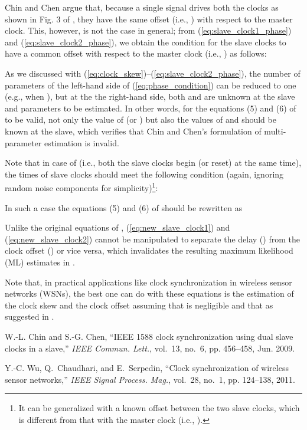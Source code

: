 \documentclass[journal,twoside,final]{IEEEtran}
\begin{document}
Chin and Chen argue that, because a single signal drives both the clocks as
shown in Fig. 3 of \cite{chin09:_ieee}, they have the same offset (i.e.,
) with respect to the master clock. This, however, is not the case in
general; from (\ref{eq:slave_clock1_phase}) and (\ref{eq:slave_clock2_phase}),
we obtain the condition for the slave clocks to have a common offset with
respect to the master clock (i.e., )
as follows:

As we discussed with (\ref{eq:clock_skew})--(\ref{eq:slave_clock2_phase}), the
number of parameters of the left-hand side of (\ref{eq:phase_condition}) can be
reduced to one (e.g.,  when ), but at
the the right-hand side, both  and  are unknown at the
slave and parameters to be estimated. In other words, for the equations (5) and
(6) of \cite{chin09:_ieee} to be valid, not only the value of  (or
) but also the values of  and  should be
known at the slave, which verifies that Chin and Chen's formulation of
multi-parameter estimation is invalid.

Note that in case of  (i.e., both the slave clocks
begin (or reset) at the same time), the times of slave clocks should meet the
following condition (again, ignoring random noise components for
simplicity)\footnote{It can be generalized with a known offset between the two
  slave clocks, which is different from that with the master clock (i.e.,
  ).}:

In such a case the equations (5) and (6) of \cite{chin09:_ieee} should be
rewritten as
\begingroup
\setlength{\arraycolsep}{0.0em}

\endgroup
Unlike the original equations of \cite{chin09:_ieee},
(\ref{eq:new_slave_clock1}) and (\ref{eq:new_slave_clock2}) cannot be
manipulated to separate the delay () from the clock offset ()
or vice versa, which invalidates the resulting maximum likelihood (ML) estimates
in \cite{chin09:_ieee}.

Note that, in practical applications like clock synchronization in wireless
sensor networks (WSNs), the best one can do with these equations is the
estimation of the clock skew and the clock offset assuming that  is
negligible and that  as suggested in
\cite{wu11:_clock_synch_wirel_sensor_networ}.

\begin{thebibliography}{10}

 W.-L. Chin and S.-G. Chen, ``{IEEE} 1588 clock
  synchronization using dual slave clocks in a slave,'' \emph{{IEEE}
    Commun. Lett.}, vol.~13, no.~6, pp.  456--458, Jun. 2009.

 Y.-C. Wu, Q.~Chaudhari, and
  E.~Serpedin, ``Clock synchronization of wireless sensor networks,''
  \emph{{IEEE} Signal Process. Mag.}, vol.~28, no.~1, pp.  124--138, 2011.

\end{thebibliography}
\end{document}
